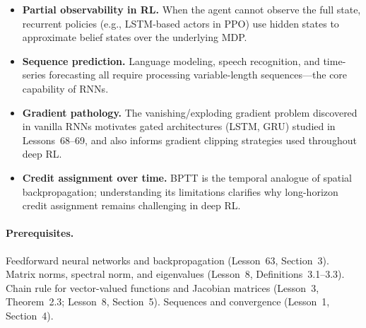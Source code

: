 \documentclass[11pt,a4paper]{article}
\begin{document}
\begin{rlconnection}[title={Why RNNs and BPTT Matter for RL/ML}]
\begin{itemize}[nosep]
  \item \textbf{Partial observability in RL.}  When the agent cannot
    observe the full state, recurrent policies (e.g., LSTM-based
    actors in PPO) use hidden states to approximate belief states
    over the underlying MDP.
  \item \textbf{Sequence prediction.}  Language modeling, speech
    recognition, and time-series forecasting all require processing
    variable-length sequences---the core capability of RNNs.
  \item \textbf{Gradient pathology.}  The vanishing/exploding gradient
    problem discovered in vanilla RNNs motivates gated architectures
    (LSTM, GRU) studied in Lessons~68--69, and also informs gradient
    clipping strategies used throughout deep RL.
  \item \textbf{Credit assignment over time.}  BPTT is the temporal
    analogue of spatial backpropagation; understanding its limitations
    clarifies why long-horizon credit assignment remains challenging
    in deep RL.
\end{itemize}
\end{rlconnection}

\paragraph{Prerequisites.}
Feedforward neural networks and backpropagation (Lesson~63,
Section~3).  Matrix norms, spectral norm, and eigenvalues
(Lesson~8, Definitions~3.1--3.3).  Chain rule for vector-valued
functions and Jacobian matrices (Lesson~3, Theorem~2.3; Lesson~8,
Section~5).  Sequences and convergence (Lesson~1, Section~4).
\end{document}
